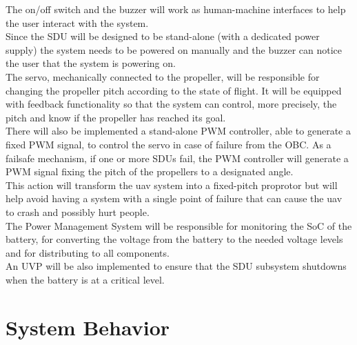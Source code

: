 The on/off switch and the buzzer will work as human-machine interfaces to help the user interact with the system.\\
Since the SDU will be designed to be stand-alone (with a dedicated power supply) the system needs to be powered on manually and the buzzer can notice the user that the system is powering on.\\

The servo, mechanically connected to the propeller, will be responsible for changing the propeller pitch according to the state of flight.
It will be equipped with feedback functionality so that the system can control, more precisely, the pitch and know if the propeller has reached its goal.\\

There will also be implemented a stand-alone \gls{PWM} controller, able to generate a fixed \gls{PWM} signal, to control the servo in case of failure from the \gls{OBC}.
As a failsafe mechanism, if one or more SDUs fail, the \gls{PWM} controller will generate a \gls{PWM} signal fixing the pitch of the propellers to a designated angle.\\
This action will transform the \gls{uav} system into a fixed-pitch proprotor but will help avoid having a system with a single point of failure that can cause the \gls{uav} to crash and possibly hurt people.\\

The Power Management System will be responsible for monitoring the \gls{SoC} of the battery, for converting the voltage from the battery to the needed voltage levels and for distributing to all components.\\
An \gls{UVP} will be also implemented to ensure that the SDU subsystem shutdowns when the battery is at a critical level.


\section{System Behavior}

